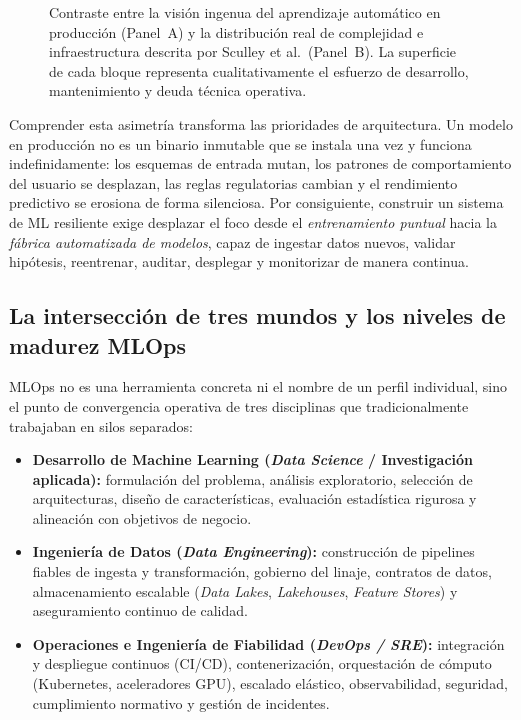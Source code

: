 \begin{figure}[htbp]
{%
}
\caption{Contraste entre la visión ingenua del aprendizaje automático en producción (Panel~A) y la distribución real de complejidad e infraestructura descrita por Sculley et al.\ (Panel~B). La superficie de cada bloque representa cualitativamente el esfuerzo de desarrollo, mantenimiento y deuda técnica operativa.}
\label{fig:mlops-ilusion-realidad}
\end{figure}

Comprender esta asimetría transforma las prioridades de arquitectura. Un modelo en producción no es un binario inmutable que se instala una vez y funciona indefinidamente: los esquemas de entrada mutan, los patrones de comportamiento del usuario se desplazan, las reglas regulatorias cambian y el rendimiento predictivo se erosiona de forma silenciosa. Por consiguiente, construir un sistema de ML resiliente exige desplazar el foco desde el \textit{entrenamiento puntual} hacia la \textit{fábrica automatizada de modelos}, capaz de ingestar datos nuevos, validar hipótesis, reentrenar, auditar, desplegar y monitorizar de manera continua.

\subsection{La intersección de tres mundos y los niveles de madurez MLOps}

MLOps no es una herramienta concreta ni el nombre de un perfil individual, sino el punto de convergencia operativa de tres disciplinas que tradicionalmente trabajaban en silos separados:

\begin{itemize}
  \item \textbf{Desarrollo de Machine Learning (\textit{Data Science} / Investigación aplicada):} formulación del problema, análisis exploratorio, selección de arquitecturas, diseño de características, evaluación estadística rigurosa y alineación con objetivos de negocio.
  \item \textbf{Ingeniería de Datos (\textit{Data Engineering}):} construcción de pipelines fiables de ingesta y transformación, gobierno del linaje, contratos de datos, almacenamiento escalable (\textit{Data Lakes}, \textit{Lakehouses}, \textit{Feature Stores}) y aseguramiento continuo de calidad.
  \item \textbf{Operaciones e Ingeniería de Fiabilidad (\textit{DevOps / SRE}):} integración y despliegue continuos (CI/CD), contenerización, orquestación de cómputo (Kubernetes, aceleradores GPU), escalado elástico, observabilidad, seguridad, cumplimiento normativo y gestión de incidentes.
\end{itemize}

